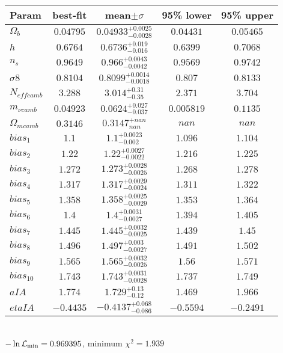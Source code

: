 \begin{tabular}{|l|c|c|c|c|} 
 \hline 
Param & best-fit & mean$\pm\sigma$ & 95\% lower & 95\% upper \\ \hline 
$\Omega_{b }$ &$0.04795$ & $0.04933_{-0.0028}^{+0.0025}$ & $0.04431$ & $0.05465$ \\ 
$h$ &$0.6764$ & $0.6736_{-0.016}^{+0.019}$ & $0.6399$ & $0.7068$ \\ 
$n_{s }$ &$0.9649$ & $0.966_{-0.0042}^{+0.0043}$ & $0.9569$ & $0.9742$ \\ 
$\sigma8$ &$0.8104$ & $0.8099_{-0.0018}^{+0.0014}$ & $0.807$ & $0.8133$ \\ 
$N_{eff camb }$ &$3.288$ & $3.014_{-0.35}^{+0.31}$ & $2.371$ & $3.704$ \\ 
$m_{\nu camb }$ &$0.04923$ & $0.0624_{-0.037}^{+0.027}$ & $0.005819$ & $0.1135$ \\ 
$\Omega_{m camb }$ &$0.3146$ & $0.3147_{nan}^{+nan}$ & $nan$ & $nan$ \\ 
$bias_{1 }$ &$1.1$ & $1.1_{-0.002}^{+0.0023}$ & $1.096$ & $1.104$ \\ 
$bias_{2 }$ &$1.22$ & $1.22_{-0.0022}^{+0.0027}$ & $1.216$ & $1.225$ \\ 
$bias_{3 }$ &$1.272$ & $1.273_{-0.0025}^{+0.0028}$ & $1.268$ & $1.278$ \\ 
$bias_{4 }$ &$1.317$ & $1.317_{-0.0024}^{+0.0029}$ & $1.311$ & $1.322$ \\ 
$bias_{5 }$ &$1.358$ & $1.358_{-0.0029}^{+0.0025}$ & $1.353$ & $1.364$ \\ 
$bias_{6 }$ &$1.4$ & $1.4_{-0.0027}^{+0.0031}$ & $1.394$ & $1.405$ \\ 
$bias_{7 }$ &$1.445$ & $1.445_{-0.0025}^{+0.0032}$ & $1.439$ & $1.45$ \\ 
$bias_{8 }$ &$1.496$ & $1.497_{-0.0027}^{+0.003}$ & $1.491$ & $1.502$ \\ 
$bias_{9 }$ &$1.565$ & $1.565_{-0.0025}^{+0.0032}$ & $1.56$ & $1.571$ \\ 
$bias_{10 }$ &$1.743$ & $1.743_{-0.0028}^{+0.0031}$ & $1.737$ & $1.749$ \\ 
$aIA$ &$1.774$ & $1.729_{-0.12}^{+0.13}$ & $1.469$ & $1.966$ \\ 
$etaIA$ &$-0.4435$ & $-0.4137_{-0.086}^{+0.068}$ & $-0.5594$ & $-0.2491$ \\ 
\hline 
 \end{tabular} \\ 
$-\ln{\cal L}_\mathrm{min} =0.969395$, minimum $\chi^2=1.939$ \\ 
